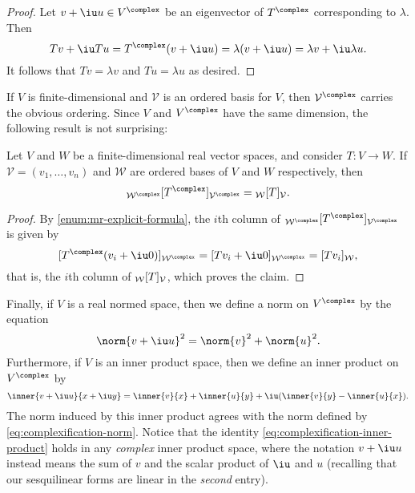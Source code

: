 \documentclass[a4paper, 11pt]{memoir}
\theoremstyle{plaincustomnumber}
\theoremstyle{changedotbreakcustomnumber}
\newcommand{\calV}{\mathcal{V}}
\newcommand{\calW}{\mathcal{W}}
\begin{document}
\begin{proof}
    Let $v + \iu u \in V^\complex$ be an eigenvector of $T^\complex$ corresponding to $\lambda$. Then
    \begin{equation*}
        Tv + \iu Tu
            = T^\complex (v + \iu u)
            = \lambda(v + \iu u)
            = \lambda v + \iu \lambda u.
    \end{equation*}
    It follows that $Tv = \lambda v$ and $Tu = \lambda u$ as desired.
\end{proof}


If $V$ is finite-dimensional and $\calV$ is an ordered basis for $V$, then $\calV^\complex$ carries the obvious ordering. Since $V$ and $V^\complex$ have the same dimension, the following result is not surprising:

\begin{proposition}
    Let $V$ and $W$ be a finite-dimensional real vector spaces, and consider $T \colon V \to W$. If $\calV = (v_1, \ldots, v_n)$ and $\calW$ are ordered bases of $V$ and $W$ respectively, then
    \begin{equation*}
        \mr{\calW^\complex}{T^\complex}{\calV^\complex}
            = \mr{\calW}{T}{\calV}.
    \end{equation*}
\end{proposition}

\begin{proof}
    By \cref{enum:mr-explicit-formula}, the $i$th column of $\mr{\calW^\complex}{T^\complex}{\calV^\complex}$ is given by
    \begin{equation*}
        \coordvec{T^\complex (v_i + \iu 0)}{\calW^\complex}
            = \coordvec{Tv_i + \iu 0}{\calW^\complex}
            = \coordvec{Tv_i}{\calW},
    \end{equation*}
    that is, the $i$th column of $\mr{\calW}{T}{\calV}$, which proves the claim.
\end{proof}


\newpar

Finally, if $V$ is a real normed space, then we define a norm on $V^\complex$ by the equation
%
\begin{equation}
    \label{eq:complexification-norm}
    \norm{v + \iu u}^2
        = \norm{v}^2 + \norm{u}^2.
\end{equation}
%
Furthermore, if $V$ is an inner product space, then we define an inner product on $V^\complex$ by
%
\begin{equation}
    \label{eq:complexification-inner-product}
    \inner{v + \iu u}{x + \iu y}
        = \inner{v}{x}
          + \inner{u}{y}
          + \iu (\inner{v}{y} - \inner{u}{x}).
\end{equation}
%
The norm induced by this inner product agrees with the norm defined by \cref{eq:complexification-norm}. Notice that the identity \cref{eq:complexification-inner-product} holds in any \emph{complex} inner product space, where the notation $v + \iu u$ instead means the sum of $v$ and the scalar product of $\iu$ and $u$ (recalling that our sesquilinear forms are linear in the \emph{second} entry).
\end{document}

